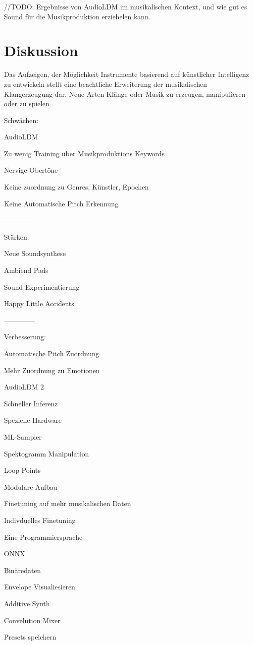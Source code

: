 \documentclass[
  a4paper,  %
  twoside,  %
  bibliography=totoc,
  headsepline,
  cleardoublepage=empty,
  parskip=half,
  draft=false
]{scrbook}
\begin{document}
//TODO: Ergebnisse von AudioLDM im musikalischen Kontext, und wie gut es Sound für die Musikproduktion erziehelen kann. 

\chapter{Diskussion}

Das Aufzeigen, der Möglichkeit Instrumente basierend auf künstlicher Intelligenz zu entwickeln stellt eine beachtliche Erweiterung der musikalischen Klangerzeugung dar. Neue Arten Klänge oder Musik zu erzeugen, manipulieren oder zu spielen  


Schwächen:

AudioLDM

Zu wenig Training über Musikproduktions Keywords

Nervige Obertöne

Keine zuordnung zu Genres, Künstler, Epochen

Keine Automatische Pitch Erkennung

--------------

Stärken:

Neue Soundsynthese

Ambiend Pads

Sound Experimentierung

Happy Little Accidents


--------------

Verbesserung:

Automatische Pitch Zuordnung

Mehr Zuordnung zu Emotionen 

AudioLDM 2

Schneller Inferenz

Spezielle Hardware 

ML-Sampler

Spektogramm Manipulation 

Loop Points

Modulare Aufbau 

Finetuning auf mehr musikalischen Daten

Indivduelles Finetuning 

Eine Programmiersprache

ONNX

Binäredaten

Envelope Visualiesieren

Additive Synth

Convelution Mixer

Presets speichern 
\end{document}
